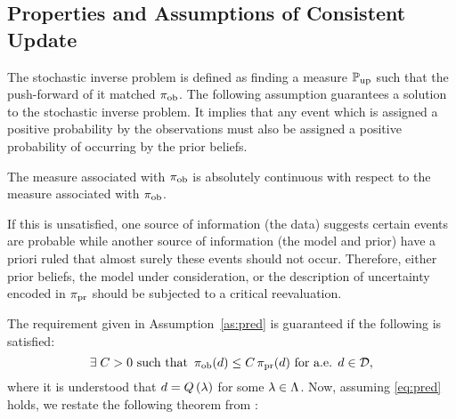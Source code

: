 
\subsection{Properties and Assumptions of Consistent Update}\label{sec:properties}
The stochastic inverse problem is defined as finding a measure $\operatorname*{\mathbb{P}_{up}}$ such that the push-forward of it matched $\operatorname*{\pi_{ob}}$.
The following assumption guarantees a solution to the stochastic inverse problem. 
It implies that any event which is assigned a positive probability by the observations must also be assigned a positive probability of occurring by the prior beliefs. 

\begin{assumption}\label{as:pred}
The measure associated with $\operatorname*{\pi_{ob}}$ is absolutely continuous with respect to the measure associated with $\operatorname*{\pi_{ob}}$.
\end{assumption}

If this is unsatisfied, one source of information (the data) suggests certain events are probable while another source of information (the model and prior) have a priori ruled that almost surely these events should not occur. 
Therefore, either prior beliefs, the model under consideration, or the description of uncertainty encoded in $\operatorname*{\pi_{pr}}$ should be subjected to a critical reevaluation. 


The requirement given in Assumption~\ref{as:pred} is guaranteed if the following is satisfied:
\begin{equation}\label{eq:pred}
\exists \; C>0 \text{ such that } \operatorname*{\pi_{ob}} (d) \leq C \operatorname*{\pi_{pr}}(d) \text{ for a.e. } d\in \mathcal{D},
\end{equation}
where it is understood that $d = Q\left ( \lambda \right )$ for some $\lambda \in {\Lambda}$.
Now, assuming \eqref{eq:pred} holds, we restate the following theorem from \cite{BJW18}:



